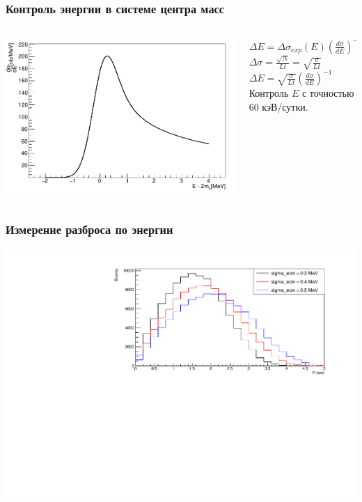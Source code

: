 \documentclass[10pt, pdf, hyperref={unicode}]{beamer}
\begin{document}
\begin{frame}
	\frametitle{Контроль энергии в системе центра масс}
	\begin{minipage}{\linewidth}
		\begin{columns}[T]
			\begin{column}{0.63\linewidth}
				\includegraphics[scale = 0.37]{deriv.png}
			\end{column}

			\begin{column}{0.37\linewidth}
				\fontsize{10pt}{20}\selectfont
				$\Delta E=\Delta \sigma_{exp}(E)\left( \frac{d\sigma}{dE} \right ) ^{-1}$\\
				$\Delta\sigma = \frac{\sqrt{N}}{Lt} = \sqrt{\frac{\sigma}{Lt}}$\\
				$\Delta E = \sqrt{\frac{\sigma}{Lt}}\left( \frac{d\sigma}{dE} \right)^{-1}$
				Контроль $E$ с точностью $60$ кэВ/сутки.
			\end{column}
		\end{columns}
	\end{minipage}

\end{frame}

\begin{frame}
	\frametitle{Измерение разброса по энергии}

	\centering
	\includegraphics[scale = 0.6]{hists.pdf}
	\par
	\end{frame}
\end{document}
